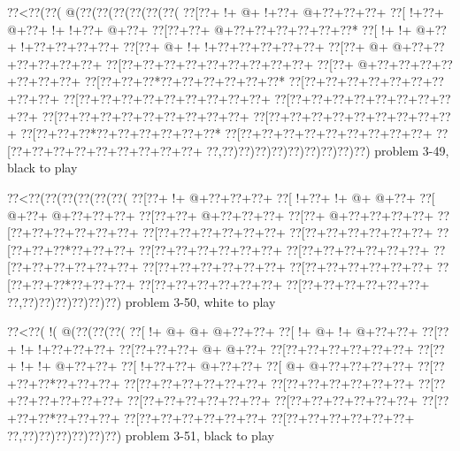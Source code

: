 \vbox{\vbox{\goo
\0??<\0??(\0??(\- @(\0??(\0??(\0??(\0??(\0??(\0??(
\0??[\0??+\- !+\- @+\- !+\0??+\- @+\0??+\0??+\0??+
\0??[\- !+\0??+\- @+\0??+\- !+\- !+\0??+\- @+\0??+
\0??[\0??+\0??+\- @+\0??+\0??+\0??+\0??+\0??+\0??*
\0??[\- !+\- !+\- @+\0??+\- !+\0??+\0??+\0??+\0??+
\0??[\0??+\- @+\- !+\- !+\0??+\0??+\0??+\0??+\0??+
\0??[\0??+\- @+\- @+\0??+\0??+\0??+\0??+\0??+\0??+
\0??[\0??+\0??+\0??+\0??+\0??+\0??+\0??+\0??+\0??+
\0??[\0??+\- @+\0??+\0??+\0??+\0??+\0??+\0??+\0??+
\0??[\0??+\0??+\0??*\0??+\0??+\0??+\0??+\0??+\0??*
\0??[\0??+\0??+\0??+\0??+\0??+\0??+\0??+\0??+\0??+
\0??[\0??+\0??+\0??+\0??+\0??+\0??+\0??+\0??+\0??+
\0??[\0??+\0??+\0??+\0??+\0??+\0??+\0??+\0??+\0??+
\0??[\0??+\0??+\0??+\0??+\0??+\0??+\0??+\0??+\0??+
\0??[\0??+\0??+\0??+\0??+\0??+\0??+\0??+\0??+\0??+
\0??[\0??+\0??+\0??*\0??+\0??+\0??+\0??+\0??+\0??*
\0??[\0??+\0??+\0??+\0??+\0??+\0??+\0??+\0??+\0??+
\0??[\0??+\0??+\0??+\0??+\0??+\0??+\0??+\0??+\0??+
\0??,\0??)\0??)\0??)\0??)\0??)\0??)\0??)\0??)\0??)
}
\hfil problem 3-49, black to play\hfil\break
}

\vbox{\vbox{\goo
\0??<\0??(\0??(\0??(\0??(\0??(\0??(
\0??[\0??+\- !+\- @+\0??+\0??+\0??+
\0??[\- !+\0??+\- !+\- @+\- @+\0??+
\0??[\- @+\0??+\- @+\0??+\0??+\0??+
\0??[\0??+\0??+\- @+\0??+\0??+\0??+
\0??[\0??+\- @+\0??+\0??+\0??+\0??+
\0??[\0??+\0??+\0??+\0??+\0??+\0??+
\0??[\0??+\0??+\0??+\0??+\0??+\0??+
\0??[\0??+\0??+\0??+\0??+\0??+\0??+
\0??[\0??+\0??+\0??*\0??+\0??+\0??+
\0??[\0??+\0??+\0??+\0??+\0??+\0??+
\0??[\0??+\0??+\0??+\0??+\0??+\0??+
\0??[\0??+\0??+\0??+\0??+\0??+\0??+
\0??[\0??+\0??+\0??+\0??+\0??+\0??+
\0??[\0??+\0??+\0??+\0??+\0??+\0??+
\0??[\0??+\0??+\0??*\0??+\0??+\0??+
\0??[\0??+\0??+\0??+\0??+\0??+\0??+
\0??[\0??+\0??+\0??+\0??+\0??+\0??+
\0??,\0??)\0??)\0??)\0??)\0??)\0??)
}
\hfil problem 3-50, white to play\hfil\break
}

\vbox{\vbox{\goo
\0??<\0??(\- !(\- @(\0??(\0??(\0??(
\0??[\- !+\- @+\- @+\- @+\0??+\0??+
\0??[\- !+\- @+\- !+\- @+\0??+\0??+
\0??[\0??+\- !+\- !+\0??+\0??+\0??+
\0??[\0??+\0??+\0??+\- @+\- @+\0??+
\0??[\0??+\0??+\0??+\0??+\0??+\0??+
\0??[\0??+\- !+\- !+\- @+\0??+\0??+
\0??[\- !+\0??+\0??+\- @+\0??+\0??+
\0??[\- @+\- @+\0??+\0??+\0??+\0??+
\0??[\0??+\0??+\0??*\0??+\0??+\0??+
\0??[\0??+\0??+\0??+\0??+\0??+\0??+
\0??[\0??+\0??+\0??+\0??+\0??+\0??+
\0??[\0??+\0??+\0??+\0??+\0??+\0??+
\0??[\0??+\0??+\0??+\0??+\0??+\0??+
\0??[\0??+\0??+\0??+\0??+\0??+\0??+
\0??[\0??+\0??+\0??*\0??+\0??+\0??+
\0??[\0??+\0??+\0??+\0??+\0??+\0??+
\0??[\0??+\0??+\0??+\0??+\0??+\0??+
\0??,\0??)\0??)\0??)\0??)\0??)\0??)
}
\hfil problem 3-51, black to play\hfil\break
}

